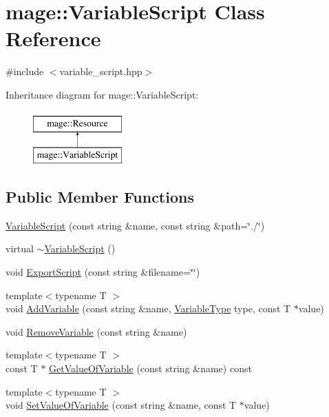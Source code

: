 \hypertarget{classmage_1_1_variable_script}{}\section{mage\+:\+:Variable\+Script Class Reference}
\label{classmage_1_1_variable_script}


{\ttfamily \#include $<$variable\+\_\+script.\+hpp$>$}

Inheritance diagram for mage\+:\+:Variable\+Script\+:\begin{figure}[H]
\begin{center}
\leavevmode
\includegraphics[height=2.000000cm]{classmage_1_1_variable_script}
\end{center}
\end{figure}
\subsection*{Public Member Functions}
\begin{DoxyCompactItemize}
\item 
\hyperlink{classmage_1_1_variable_script_a8b40c66f4f025bbf85b60ac57eb92248}{Variable\+Script} (const string \&name, const string \&path=\char`\"{}./\char`\"{})
\item 
virtual \hyperlink{classmage_1_1_variable_script_a8c488e779a6444559bded669a3e038c8}{$\sim$\+Variable\+Script} ()
\item 
void \hyperlink{classmage_1_1_variable_script_a863930f2c84786c2bb5bfa090cda06f7}{Export\+Script} (const string \&filename=\char`\"{}\char`\"{})
\item 
{\footnotesize template$<$typename T $>$ }\\void \hyperlink{classmage_1_1_variable_script_aa9a8bb9b6133ce853052820961320ca9}{Add\+Variable} (const string \&name, \hyperlink{namespacemage_a530428e73bac0ba7fe84b29086a9e33a}{Variable\+Type} type, const T $\ast$value)
\item 
void \hyperlink{classmage_1_1_variable_script_a4970ef4faafb1a6a43c4648ec9f36cce}{Remove\+Variable} (const string \&name)
\item 
{\footnotesize template$<$typename T $>$ }\\const T $\ast$ \hyperlink{classmage_1_1_variable_script_a231b83e1e32b882489ed90faa69f7137}{Get\+Value\+Of\+Variable} (const string \&name) const
\item 
{\footnotesize template$<$typename T $>$ }\\void \hyperlink{classmage_1_1_variable_script_a1b6daa6b226e43564408ab54e4c65eb7}{Set\+Value\+Of\+Variable} (const string \&name, const T $\ast$value)
\end{DoxyCompactItemize}

